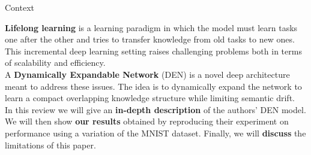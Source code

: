 \documentclass[a0paper,portrait]{baposter}
\begin{document}
\begin{poster}
{}

























































\begin{posterbox}[name=intro,column=0,row=0]{Context}

\textbf{Lifelong learning}\cite{LL94} is a learning paradigm in which the model must learn tasks one after the other and tries to transfer knowledge from old tasks to new ones. This incremental deep learning setting raises challenging problems both in terms of scalability and efficiency.\\

A \textbf{Dynamically Expandable Network} (DEN) is a novel deep architecture meant to address these issues\cite{DEN17}. The idea is to dynamically expand the network to learn a compact overlapping knowledge structure while limiting semantic drift.\\

In this review we will give an \textbf{in-depth description} of the authors' DEN model. We will then show \textbf{our results} obtained by reproducing their experiment on performance using a variation of the MNIST dataset. Finally, we will \textbf{discuss} the limitations of this paper.

\vspace{3pt}
\end{posterbox}


\end{poster}
\end{document}
